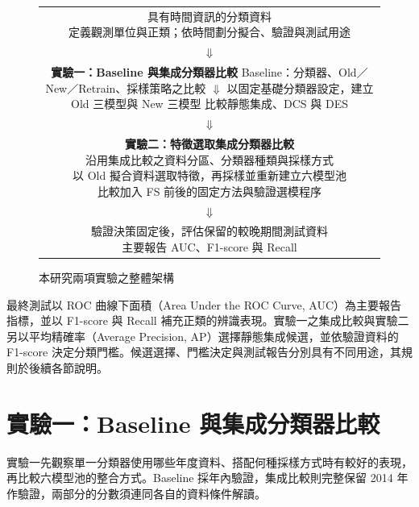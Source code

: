 \begin{figure}[htbp]
\centering
\begingroup
\small
{}
\setlength{\fboxsep}{8pt}
\begin{tabular}{@{}c@{}}
\fbox{\parbox{0.88\linewidth}{\centering 具有時間資訊的分類資料\\
定義觀測單位與正類；依時間劃分擬合、驗證與測試用途}}\\[3pt]
\(\Downarrow\)\\[3pt]
\fbox{\parbox{0.88\linewidth}{\centering\textbf{實驗一：Baseline 與集成分類器比較}\\[4pt]
Baseline：分類器、Old／New／Retrain、採樣策略之比較\\
\(\Downarrow\)\\
以固定基礎分類器設定，建立 Old 三模型與 New 三模型\\
比較靜態集成、DCS 與 DES}}\\[3pt]
\(\Downarrow\)\\[3pt]
\fbox{\parbox{0.88\linewidth}{\centering\textbf{實驗二：特徵選取集成分類器比較}\\[4pt]
沿用集成比較之資料分區、分類器種類與採樣方式\\
以 Old 擬合資料選取特徵，再採樣並重新建立六模型池\\
比較加入 FS 前後的固定方法與驗證選模程序}}\\[3pt]
\(\Downarrow\)\\[3pt]
\fbox{\parbox{0.88\linewidth}{\centering 驗證決策固定後，評估保留的較晚期間測試資料\\
主要報告 AUC、F1-score 與 Recall}}
\end{tabular}
\endgroup
\caption{本研究兩項實驗之整體架構}\label{fig:method-overview}
\par{}
\end{figure}

最終測試以 ROC 曲線下面積（Area Under the ROC Curve, AUC）為主要報告指標，並以 F1-score 與 Recall 補充正類的辨識表現。實驗一之集成比較與實驗二另以平均精確率（Average Precision, AP）選擇靜態集成候選，並依驗證資料的 F1-score 決定分類門檻。候選選擇、門檻決定與測試報告分別具有不同用途，其規則於後續各節說明。

\section{實驗一：Baseline 與集成分類器比較}\label{sec:method-experiment1}

實驗一先觀察單一分類器使用哪些年度資料、搭配何種採樣方式時有較好的表現，再比較六模型池的整合方式。Baseline 採年內驗證，集成比較則完整保留 2014 年作驗證，兩部分的分數須連同各自的資料條件解讀。

